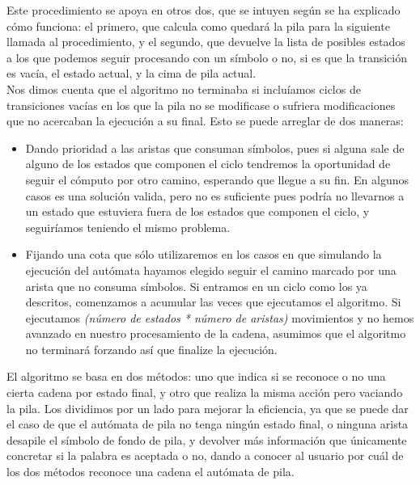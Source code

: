 \documentclass[12pt,a4paper,spanish]{book}
\begin{document}
Este procedimiento se apoya en otros dos, que se intuyen seg\'un se ha explicado c\'omo funciona: el primero, que calcula como quedar\'a la pila para la siguiente llamada al procedimiento, y el segundo, que devuelve la lista de posibles estados a los que podemos seguir procesando con un s\'imbolo o no, si es que la transici\'on es vac\'ia, el estado actual, y la cima de pila actual.\\

Nos dimos cuenta que el algoritmo no terminaba si inclu\'iamos ciclos de transiciones vac\'ias en los que la pila no se modificase o sufriera modificaciones que no acercaban la ejecuci\'on a su final. Esto se puede arreglar de dos maneras:

\begin{itemize}

\item Dando prioridad a las aristas que consuman s\'imbolos, pues si alguna sale de alguno de los estados que componen el ciclo tendremos la oportunidad de seguir el c\'omputo por otro camino, esperando que llegue a su fin. En algunos casos es una soluci\'on valida, pero no es suficiente pues podr\'ia no llevarnos a un estado que estuviera fuera de los estados que componen el ciclo, y seguir\'iamos teniendo el mismo problema.

\item Fijando una cota que s\'olo utilizaremos en los casos en que simulando la ejecuci\'on del aut\'omata hayamos elegido seguir el camino marcado por una arista que no consuma s\'imbolos. Si entramos en un ciclo como los ya descritos, comenzamos a acumular las veces que ejecutamos el algoritmo. Si ejecutamos {\it (n\'umero de estados * n\'umero de aristas)} movimientos y no hemos avanzado en nuestro procesamiento de la cadena, asumimos que el algoritmo no terminar\'a forzando as\'i que finalize la ejecuci\'on.\\

\end{itemize}


El algoritmo se basa en dos m\'etodos: uno que indica si se reconoce o no una cierta cadena por estado final, y otro que realiza la misma acci\'on pero vaciando la pila. Los dividimos por un lado para mejorar la eficiencia, ya que se puede dar el caso de que el aut\'omata de pila no tenga ning\'un estado final, o ninguna arista desapile el s\'imbolo de fondo de pila, y devolver m\'as informaci\'on que \'unicamente concretar si la palabra es aceptada o no, dando a conocer al usuario por cu\'al de los dos m\'etodos reconoce una cadena el aut\'omata de pila. \\
\end{document}
